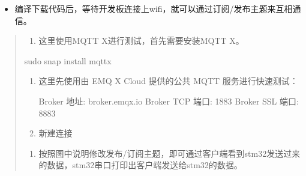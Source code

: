 \documentclass[a4paper,12pt,english]{sphinxmanual}
\begin{document}
\begin{itemize}
\begin{sphinxVerbatim}[commandchars=\\\{\}]
\end{sphinxVerbatim}

\item {} 
\sphinxAtStartPar
编译下载代码后，等待开发板连接上wifi，就可以通过订阅/发布主题来互相通信。

\end{itemize}
\begin{quote}
\begin{enumerate}
%
\item {} 
\sphinxAtStartPar
这里使用MQTT X进行测试，首先需要安装MQTT X。

\end{enumerate}

\begin{sphinxVerbatim}[commandchars=\\\{\}]
sudo snap install mqttx
\end{sphinxVerbatim}
\begin{enumerate}
%
\setcounter{enumi}{1}
\item {} 
\sphinxAtStartPar
这里先使用由 EMQ X Cloud 提供的公共 MQTT 服务进行快速测试：

\sphinxAtStartPar
Broker 地址: broker.emqx.io
Broker TCP 端口: 1883
Broker SSL 端口: 8883

\item {} 
\sphinxAtStartPar
新建连接

\end{enumerate}

\sphinxAtStartPar
{}
\begin{enumerate}
%
\setcounter{enumi}{3}
\item {} 
\sphinxAtStartPar
按照图中说明修改发布/订阅主题，即可通过客户端看到stm32发送过来的数据，stm32串口打印出客户端发送给stm32的数据。

\end{enumerate}

\sphinxAtStartPar
{}


\end{quote}
\end{document}
